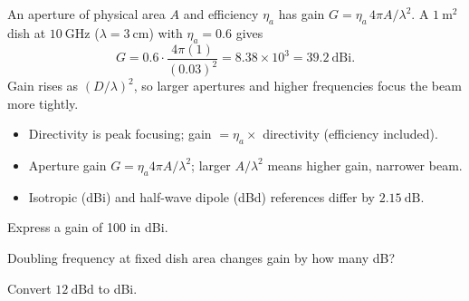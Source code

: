 \begin{workedexample}
An aperture of physical area $A$ and efficiency $\eta_a$ has gain
$G = \eta_a\,4\pi A/\lambda^2$. A $1\ \text{m}^2$ dish at $10\ \text{GHz}$
($\lambda = 3\ \text{cm}$) with $\eta_a = 0.6$ gives
\[ G = 0.6\cdot\frac{4\pi(1)}{(0.03)^2} = 8.38\times10^{3} = 39.2\ \text{dBi}. \]
Gain rises as $(D/\lambda)^2$, so larger apertures and higher frequencies focus
the beam more tightly.
\end{workedexample}

\begin{keytakeaways}
\begin{itemize}[leftmargin=1.4em,itemsep=2pt]
\item Directivity is peak focusing; gain $= \eta_a\times$ directivity (efficiency included).
\item Aperture gain $G = \eta_a 4\pi A/\lambda^2$; larger $A/\lambda^2$ means higher gain, narrower beam.
\item Isotropic (dBi) and half-wave dipole (dBd) references differ by $2.15\ \text{dB}$.
\end{itemize}
\end{keytakeaways}

\begin{exercises}
\item Express a gain of 100 in dBi.
\item Doubling frequency at fixed dish area changes gain by how many dB?
\item Convert $12\ \text{dBd}$ to dBi.
\end{exercises}

